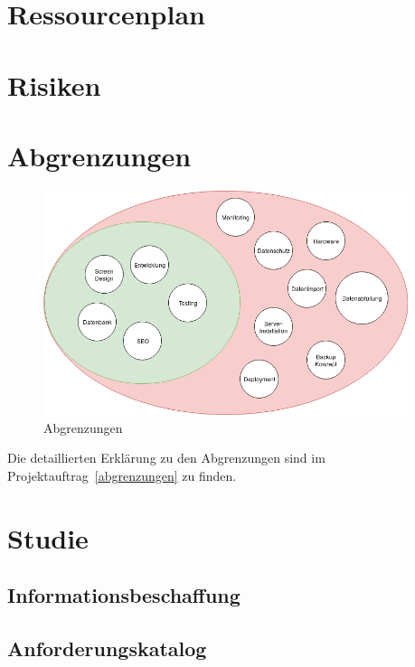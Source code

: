 \section{Ressourcenplan}

\section{Risiken}

\clearpage

\section{Abgrenzungen}

\begin{figure}[!htb]
  \centering
  \includegraphics[width=0.95\textwidth]{figures/abgrenzungen.png}
  \caption{Abgrenzungen}
\end{figure}

Die detaillierten Erklärung zu den Abgrenzungen sind im Projektauftrag~\ref{abgrenzungen} zu finden.

\clearpage

\section{Studie}

\subsection{Informationsbeschaffung}

\clearpage
\subsection{Anforderungskatalog}

